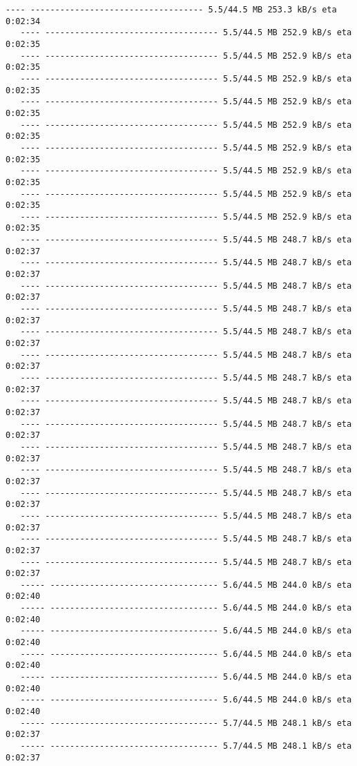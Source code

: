\documentclass[11pt]{article}
\begin{document}
\begin{Verbatim}[commandchars=\\\{\}]
   ---- ----------------------------------- 5.5/44.5 MB 253.3 kB/s eta 0:02:34
   ---- ----------------------------------- 5.5/44.5 MB 252.9 kB/s eta 0:02:35
   ---- ----------------------------------- 5.5/44.5 MB 252.9 kB/s eta 0:02:35
   ---- ----------------------------------- 5.5/44.5 MB 252.9 kB/s eta 0:02:35
   ---- ----------------------------------- 5.5/44.5 MB 252.9 kB/s eta 0:02:35
   ---- ----------------------------------- 5.5/44.5 MB 252.9 kB/s eta 0:02:35
   ---- ----------------------------------- 5.5/44.5 MB 252.9 kB/s eta 0:02:35
   ---- ----------------------------------- 5.5/44.5 MB 252.9 kB/s eta 0:02:35
   ---- ----------------------------------- 5.5/44.5 MB 252.9 kB/s eta 0:02:35
   ---- ----------------------------------- 5.5/44.5 MB 252.9 kB/s eta 0:02:35
   ---- ----------------------------------- 5.5/44.5 MB 248.7 kB/s eta 0:02:37
   ---- ----------------------------------- 5.5/44.5 MB 248.7 kB/s eta 0:02:37
   ---- ----------------------------------- 5.5/44.5 MB 248.7 kB/s eta 0:02:37
   ---- ----------------------------------- 5.5/44.5 MB 248.7 kB/s eta 0:02:37
   ---- ----------------------------------- 5.5/44.5 MB 248.7 kB/s eta 0:02:37
   ---- ----------------------------------- 5.5/44.5 MB 248.7 kB/s eta 0:02:37
   ---- ----------------------------------- 5.5/44.5 MB 248.7 kB/s eta 0:02:37
   ---- ----------------------------------- 5.5/44.5 MB 248.7 kB/s eta 0:02:37
   ---- ----------------------------------- 5.5/44.5 MB 248.7 kB/s eta 0:02:37
   ---- ----------------------------------- 5.5/44.5 MB 248.7 kB/s eta 0:02:37
   ---- ----------------------------------- 5.5/44.5 MB 248.7 kB/s eta 0:02:37
   ---- ----------------------------------- 5.5/44.5 MB 248.7 kB/s eta 0:02:37
   ---- ----------------------------------- 5.5/44.5 MB 248.7 kB/s eta 0:02:37
   ---- ----------------------------------- 5.5/44.5 MB 248.7 kB/s eta 0:02:37
   ---- ----------------------------------- 5.5/44.5 MB 248.7 kB/s eta 0:02:37
   ----- ---------------------------------- 5.6/44.5 MB 244.0 kB/s eta 0:02:40
   ----- ---------------------------------- 5.6/44.5 MB 244.0 kB/s eta 0:02:40
   ----- ---------------------------------- 5.6/44.5 MB 244.0 kB/s eta 0:02:40
   ----- ---------------------------------- 5.6/44.5 MB 244.0 kB/s eta 0:02:40
   ----- ---------------------------------- 5.6/44.5 MB 244.0 kB/s eta 0:02:40
   ----- ---------------------------------- 5.6/44.5 MB 244.0 kB/s eta 0:02:40
   ----- ---------------------------------- 5.7/44.5 MB 248.1 kB/s eta 0:02:37
   ----- ---------------------------------- 5.7/44.5 MB 248.1 kB/s eta 0:02:37

\end{Verbatim}
\end{document}
